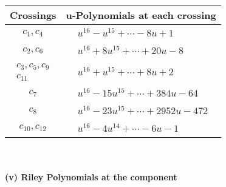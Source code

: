 \documentclass[1p]{elsarticle_modified}
\theoremstyle{definition}
\begin{document}
\begin{tabular}{m{50pt}|m{274pt}}
Crossings & \hspace{64pt}u-Polynomials at each crossing \\
\hline $$\begin{aligned}c_{1},c_{4}\end{aligned}$$&$\begin{aligned}
&u^{16}- u^{15}+\cdots-8 u+1
\end{aligned}$\\
\hline $$\begin{aligned}c_{2},c_{6}\end{aligned}$$&$\begin{aligned}
&u^{16}+8 u^{15}+\cdots+20 u-8
\end{aligned}$\\
\hline $$\begin{aligned}c_{3},c_{5},c_{9}\\c_{11}\end{aligned}$$&$\begin{aligned}
&u^{16}+u^{15}+\cdots+8 u+2
\end{aligned}$\\
\hline $$\begin{aligned}c_{7}\end{aligned}$$&$\begin{aligned}
&u^{16}-15 u^{15}+\cdots+384 u-64
\end{aligned}$\\
\hline $$\begin{aligned}c_{8}\end{aligned}$$&$\begin{aligned}
&u^{16}-23 u^{15}+\cdots+2952 u-472
\end{aligned}$\\
\hline $$\begin{aligned}c_{10},c_{12}\end{aligned}$$&$\begin{aligned}
&u^{16}-4 u^{14}+\cdots-6 u-1
\end{aligned}$\\
\hline
\end{tabular}\\~\\
\newpage\renewcommand{\arraystretch}{1}
\flushleft \textbf{(v) Riley Polynomials at the component}\newline \\
\end{document}
